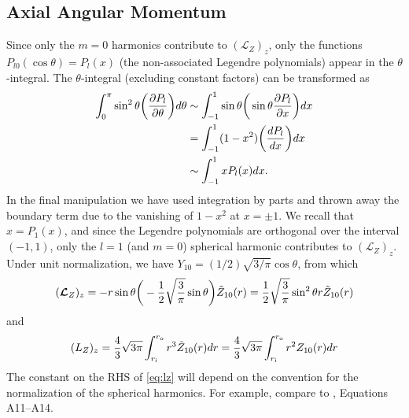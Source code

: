 \documentclass[12pt]{article} %
\newcommand{\pderiv}[2]{\frac{\partial#1}{\partial#2}}
\newcommand{\tz}{\tilde{Z}}
\newcommand{\ri}{r_{\rm{i}}}
\newcommand{\ro}{r_{\rm{o}}}
\begin{document}
\subsection{Axial Angular Momentum}
Since only the $m=0$ harmonics contribute to $(\bm{\mathcal{L}}_Z)_z$, only the functions $P_{l0}(\cos\theta) = P_l(x)$ (the non-associated Legendre polynomials) appear in the $\theta$-integral. The $\theta$-integral (excluding constant factors) can be transformed as
\begin{align*}
\int_0^\pi \sin^2\theta \bigg{(}\pderiv{P_l}{\theta}\bigg{)}d\theta &\sim \int_{-1}^1\sin\theta\bigg{(}\sin\theta\pderiv{P_l}{x}\bigg{)}dx\\
	&= \int_{-1}^1(1-x^2)\bigg{(}\frac{dP_l}{dx}\bigg{)}dx\\
	&\sim\int_{-1}^1xP_l(x)dx.
\end{align*}
In the final manipulation we have used integration by parts and thrown away the boundary term due to the vanishing of $1-x^2$ at $x=\pm1$. We recall that $x=P_1(x)$, and since the Legendre polynomials are orthogonal over the interval $(-1,1)$, only the $l=1$ (and $m=0$) spherical harmonic contributes to  $(\bm{\mathcal{L}}_Z)_z$. Under unit normalization, we have $Y_{10} = (1/2)\sqrt{3/\pi}\cos\theta$, from which 
\begin{align*}
(\bm{\mathcal{L}}_Z)_z = -r\sin\theta\bigg{(}-\frac{1}{2}\sqrt{\frac{3}{\pi}}\sin\theta\bigg{)}\tz_{10}(r) = \frac{1}{2}\sqrt{\frac{3}{\pi}}\sin^2\theta r \tz_{10}(r)
\end{align*}
and
\begin{align}
(L_Z)_z = \frac{4}{3}\sqrt{3\pi}\int_{\ri}^{\ro}r^3\tz_{10}(r)dr =  \frac{4}{3}\sqrt{3\pi}\int_{\ri}^{\ro}r^2Z_{10}(r)dr
\label{eq:lz}
\end{align}
The constant on the RHS of \eqref{eq:lz} will depend on the convention for the normalization of the spherical harmonics. For example, compare to \citet{Jones2011}, Equations A11--A14. 
\end{document}
